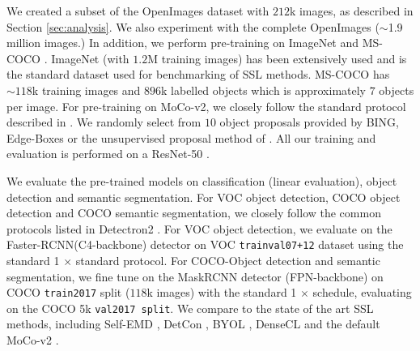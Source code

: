 We created a subset of the OpenImages dataset with $212$k images, as described in Section \ref{sec:analysis}. We also experiment with the complete OpenImages ($\sim$1.9 million images.)
In addition, we perform pre-training on ImageNet \citep{imagenet_cvpr09} and MS-COCO \citep{Lin2014MicrosoftCC}.
ImageNet (with $1.2$M training images) has been extensively used and is the standard dataset used for benchmarking of SSL methods. MS-COCO has $\sim118$k training images and $896$k labelled objects which is approximately $7$ objects per image. For pre-training on MoCo-v2, we closely follow the standard protocol described in \citet{chen2020improved}. We randomly select from $10$ object proposals provided by BING, Edge-Boxes or the unsupervised proposal method of \citep{vo2019unsupervised}. All our training and evaluation is performed on a ResNet-50 \citep{He2015}. 


We evaluate the pre-trained models on classification (linear evaluation), object detection and semantic segmentation. For VOC object detection, COCO object detection and COCO semantic segmentation, we closely follow the common protocols listed in Detectron2 \citep{wu2019detectron2}. For VOC object detection, we evaluate on the Faster-RCNN(C4-backbone) \citep{Ren2015FasterRT} detector on VOC \texttt{trainval07+12} dataset  using the standard 1 $\times$  standard protocol. For COCO-Object detection and semantic segmentation, we fine tune on the MaskRCNN detector (FPN-backbone) \citep{he2018mask} on COCO \texttt{train2017} split ($118$k images) with the standard 1 $\times$ schedule, evaluating on the COCO 5k \texttt{val2017 split}. We compare to the state of the art SSL methods, including Self-EMD \citep{liu2021selfemd}, DetCon \citep{henaff2021efficient}, BYOL \citep{richemond2020byol}, DenseCL \citep{wang2021dense} and the default MoCo-v2 \citep{chen2020improved}. 



